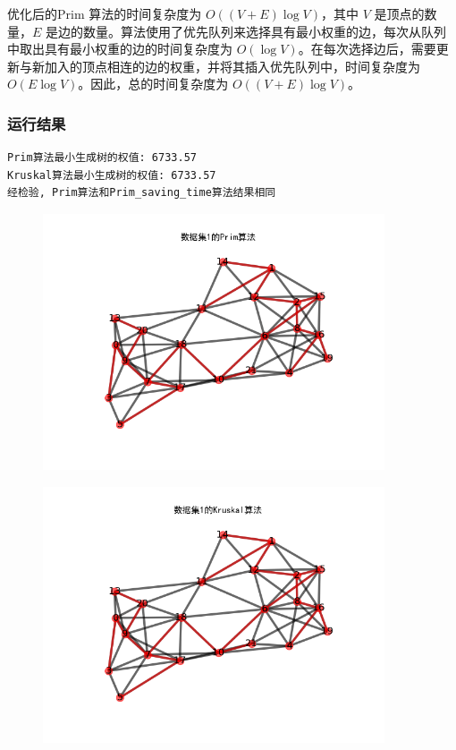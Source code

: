 \documentclass[lang=cn,11pt,a4paper]{elegantpaper}
\begin{document}
优化后的Prim 算法的时间复杂度为 $O((V + E) \log V)$，其中 $V$ 是顶点的数量，$E$ 是边的数量。算法使用了优先队列来选择具有最小权重的边，每次从队列中取出具有最小权重的边的时间复杂度为 $O(\log V)$。在每次选择边后，需要更新与新加入的顶点相连的边的权重，并将其插入优先队列中，时间复杂度为 $O(E \log V)$。因此，总的时间复杂度为 $O((V + E) \log V)$。


\subsubsection{运行结果}
\begin{lstlisting}[language=text]
Prim算法最小生成树的权值: 6733.57
Kruskal算法最小生成树的权值: 6733.57
经检验, Prim算法和Prim_saving_time算法结果相同
\end{lstlisting}

\begin{figure}[H]
    \centering
    \includegraphics[width=0.9\textwidth, height=0.38\textheight]{image/数据集1的Prim算法.png}
\end{figure}

\begin{figure}[H]
    \centering
    \includegraphics[width=0.9\textwidth, height=0.38\textheight]{image/数据集1的Kruskal算法.png}
\end{figure}
\end{document}
